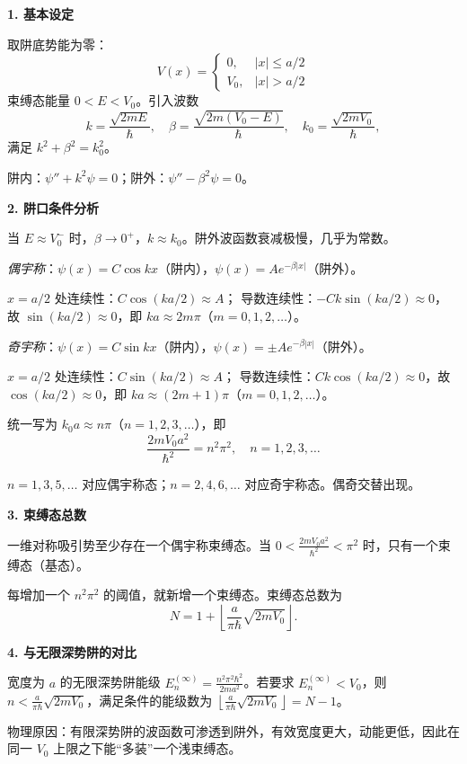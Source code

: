 \begin{derivationbox}[标准解题过程]
\textbf{1. 基本设定}

取阱底势能为零：
\[
V(x)=\begin{cases}0, & |x|\le a/2 \\ V_0, & |x|>a/2\end{cases}
\]
束缚态能量 $0<E<V_0$。引入波数
\[
k=\frac{\sqrt{2mE}}{\hbar},\quad \beta=\frac{\sqrt{2m(V_0-E)}}{\hbar},\quad k_0=\frac{\sqrt{2mV_0}}{\hbar},
\]
满足 $k^2+\beta^2=k_0^2$。

阱内：$\psi''+k^2\psi=0$；阱外：$\psi''-\beta^2\psi=0$。

\textbf{2. 阱口条件分析}

当 $E\approx V_0^-$ 时，$\beta\to0^+$，$k\approx k_0$。阱外波函数衰减极慢，几乎为常数。

\textit{偶宇称}：$\psi(x)=C\cos kx$（阱内），$\psi(x)=Ae^{-\beta|x|}$（阱外）。

$x=a/2$ 处连续性：$C\cos(ka/2)\approx A$；
导数连续性：$-Ck\sin(ka/2)\approx0$，故 $\sin(ka/2)\approx0$，即 $ka\approx2m\pi$（$m=0,1,2,\dots$）。

\textit{奇宇称}：$\psi(x)=C\sin kx$（阱内），$\psi(x)=\pm Ae^{-\beta|x|}$（阱外）。

$x=a/2$ 处连续性：$C\sin(ka/2)\approx A$；
导数连续性：$Ck\cos(ka/2)\approx0$，故 $\cos(ka/2)\approx0$，即 $ka\approx(2m+1)\pi$（$m=0,1,2,\dots$）。

统一写为 $k_0a\approx n\pi$（$n=1,2,3,\dots$），即
\begin{equation}
\boxed{\frac{2mV_0a^2}{\hbar^2}=n^2\pi^2,\quad n=1,2,3,\ldots}
\end{equation}

$n=1,3,5,\dots$ 对应偶宇称态；$n=2,4,6,\dots$ 对应奇宇称态。偶奇交替出现。

\textbf{3. 束缚态总数}

一维对称吸引势至少存在一个偶宇称束缚态。当 $0<\frac{2mV_0a^2}{\hbar^2}<\pi^2$ 时，只有一个束缚态（基态）。

每增加一个 $n^2\pi^2$ 的阈值，就新增一个束缚态。束缚态总数为
\begin{equation}
\boxed{N=1+\left\lfloor\frac{a}{\pi\hbar}\sqrt{2mV_0}\right\rfloor.}
\end{equation}

\textbf{4. 与无限深势阱的对比}

宽度为 $a$ 的无限深势阱能级 $E_n^{(\infty)}=\frac{n^2\pi^2\hbar^2}{2ma^2}$。若要求 $E_n^{(\infty)}<V_0$，则 $n<\frac{a}{\pi\hbar}\sqrt{2mV_0}$，满足条件的能级数为 $\left\lfloor\frac{a}{\pi\hbar}\sqrt{2mV_0}\right\rfloor=N-1$。

物理原因：有限深势阱的波函数可渗透到阱外，有效宽度更大，动能更低，因此在同一 $V_0$ 上限之下能``多装''一个浅束缚态。
\end{derivationbox}

